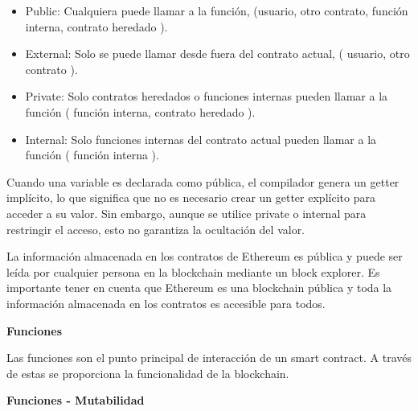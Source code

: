 \begin{itemize}
    \item Public: Cualquiera puede llamar a la función, (usuario, otro contrato, función interna, contrato heredado ).

    \item External: Solo se puede llamar desde fuera del contrato actual, ( usuario, otro contrato ).

    \item Private: Solo contratos heredados o funciones internas pueden llamar a la función ( función  interna, contrato heredado ).

    \item Internal: Solo funciones internas del contrato actual pueden llamar a la función ( función interna ).
\end{itemize}

\bigskip 



Cuando una variable es declarada como pública, el compilador genera un getter implícito, lo que significa que no es necesario crear un getter explícito para acceder a su valor. Sin embargo, aunque se utilice private o internal para restringir el acceso, esto no garantiza la ocultación del valor.

\bigskip 

La información almacenada en los contratos de Ethereum es pública y puede ser leída por cualquier persona en la blockchain mediante un block explorer. Es importante tener en cuenta que Ethereum es una blockchain pública y toda la información almacenada en los contratos es accesible para todos.

\bigskip 



\bigskip

\textbf{Funciones}

\bigskip

Las funciones son el punto principal de interacción de un smart contract. A través de estas se proporciona la funcionalidad de la blockchain.


\bigskip

\textbf{Funciones - Mutabilidad}

\bigskip

